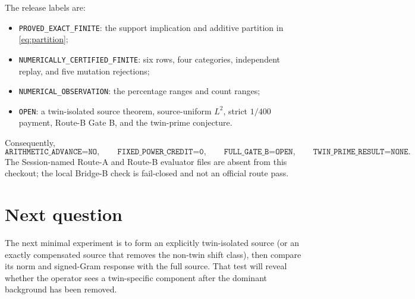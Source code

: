 \documentclass[10pt]{article}
\begin{document}
The release labels are:
\begin{itemize}
\item \texttt{PROVED\_EXACT\_FINITE}: the support implication and additive
      partition in \eqref{eq:partition};
\item \texttt{NUMERICALLY\_CERTIFIED\_FINITE}: six rows, four categories,
      independent replay, and five mutation rejections;
\item \texttt{NUMERICAL\_OBSERVATION}: the percentage ranges and count ranges;
\item \texttt{OPEN}: a twin-isolated source theorem, source-uniform $L^2$,
      strict $1/400$ payment, Route-B Gate B, and the twin-prime conjecture.
\end{itemize}
Consequently,
\[
 \texttt{ARITHMETIC\_ADVANCE=NO},\qquad
 \texttt{FIXED\_POWER\_CREDIT=0},\qquad
 \texttt{FULL\_GATE\_B=OPEN},\qquad
 \texttt{TWIN\_PRIME\_RESULT=NONE}.
\]
The Session-named Route-A and Route-B evaluator files are absent from this
checkout; the local Bridge-B check is fail-closed and not an official route
pass.

\section{Next question}

The next minimal experiment is to form an explicitly twin-isolated source (or
an exactly compensated source that removes the non-twin shift class), then
compare its norm and signed-Gram response with the full source.  That test
will reveal whether the operator sees a twin-specific component after the
dominant background has been removed.
\end{document}
